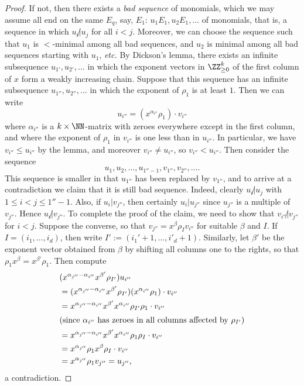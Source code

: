 \documentclass{amsart}
\begin{document}
\begin{proof}
If not, then there exists a {\em bad sequence} of monomials, which we may
assume all end on the same $E_q$, say, $E_1$: $u_1 E_1,u_2 E_1,\ldots$
of monomials, that is, a sequence in which $u_i \not | u_j$ for all
$i<j$. Moreover, we
can choose the sequence such that $u_1$ is $<$-minimal among all bad
sequences, and $u_2$ is minimal among all bad sequences starting with
$u_1$, {\em etc.} By Dickson's lemma, there exists an infinite subsequence
$u_{1'},u_{2'},\ldots$ in which the exponent vectors in $\ZZ_{\geq 0}^k$
of the first column of $x$ form a weakly increasing chain. Suppose
that this sequence has an infinite subsequence $u_{1''},u_{2''},\ldots$
in which the exponent of $\rho_1$ is at least $1$. Then we can write
\[ u_{i''}=(x^{\alpha_{i''}} \rho_1) \cdot v_{i''} \]
where $\alpha_{i''}$ is a $k \times \NN$-matrix with zeroes
everywhere except in the first column, and where the exponent of
$\rho_1$ in $v_{i''}$ is one less than in $u_{i''}$. In particular,
we have $v_{i''} \leq u_{i''}$ by the lemma, and moreover $v_{i''}
\neq u_{i''}$, so $v_{i''}<u_{i''}$. Then consider the sequence \[
u_1,u_2,\ldots,u_{1''-1},v_{1''},v_{2''},\ldots.\] This sequence is
smaller in that $u_{1''}$ has been replaced by $v_{1''}$, and to
arrive at a contradiction we claim that it is still bad sequence.
Indeed, clearly $u_i \not | u_j$ with $1 \leq i < j \leq 1''-1$. Also,
if $u_i | v_{j''}$, then certainly $u_i | u_{j''}$ since
$u_{j''}$ is
a multiple of $v_{j''}$. Hence $u_i \not | v_{j''}$. To complete the
proof of the claim, we need to show that $v_{i''} \not | v_{j''}$ for
$i<j$. Suppose the converse, so that $v_{j''}=x^\beta \rho_I v_{i''}$
for suitable $\beta$ and $I$. If $I=(i_1,\ldots,i_d)$, then write
$I':=(i_1'+1,\ldots,i'_d+1)$. Similarly, let $\beta'$ be the exponent
vector obtained from $\beta$ by shifting all columns one to the rights,
so that $\rho_1 x^\beta=x^{\beta'} \rho_1$. Then compute
\begin{align*} 
&(x^{\alpha_{j''}-\alpha_{i''}} x^{\beta'}
\rho_{I'})u_{i''}\\
&=(x^{\alpha_{j''}-\alpha_{i''}} x^{\beta'} \rho_{I'})
(x^{\alpha_{i''}} \rho_1) \cdot v_{i''}\\
&=x^{\alpha_{j''}-\alpha_{i''}} x^{\beta'} 
x^{\alpha_{i''}} \rho_{I'} \rho_1 \cdot v_{i''}\\
\intertext{(since $\alpha_{i''}$ has zeroes in all columns
affected by $\rho_{I'}$)}
&=x^{\alpha_{j''}-\alpha_{i''}} x^{\beta'} 
x^{\alpha_{i''}} \rho_1 \rho_I \cdot v_{i''}\\
&=x^{\alpha_{j''}} \rho_1 x^{\beta} 
\rho_I \cdot v_{i''}\\
&=x^{\alpha_{j''}} \rho_1 v_{j''}=u_{j''},
\end{align*}
a contradiction. 


\end{proof}
\end{document}
